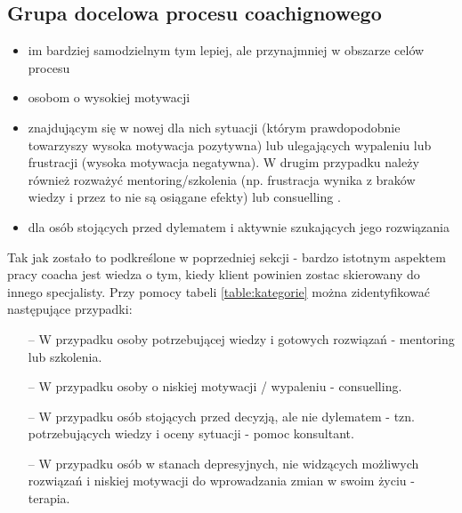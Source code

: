 \subsection{Grupa docelowa procesu coachignowego}

\begin{itemize}
  \item im bardziej samodzielnym tym lepiej, ale przynajmniej w obszarze celów procesu
  \item osobom o wysokiej motywacji
  \item znajdującym się w nowej dla nich sytuacji (którym prawdopodobnie towarzyszy wysoka motywacja pozytywna) lub
       ulegających wypaleniu lub frustracji (wysoka motywacja negatywna). W drugim przypadku należy również rozważyć
       mentoring/szkolenia (np. frustracja wynika z braków wiedzy i przez to nie są osiągane efekty) lub consuelling .
  \item dla osób stojących przed dylematem i aktywnie szukających jego rozwiązania
\end{itemize}

Tak jak zostało to podkreślone w poprzedniej sekcji - bardzo istotnym aspektem pracy coacha jest wiedza o tym, kiedy klient powinien
zostac skierowany do innego specjalisty. Przy pomocy tabeli \ref{table:kategorie} można zidentyfikować następujące przypadki:
\begin{itemize}
\item[--] W przypadku osoby potrzebującej wiedzy i gotowych rozwiązań - mentoring lub szkolenia.
\item[--] W przypadku osoby o niskiej motywacji / wypaleniu - consuelling.
\item[--] W przypadku osób stojących przed decyzją, ale nie dylematem - tzn. potrzebujących wiedzy i oceny sytuacji - pomoc konsultant.
\item[--] W przypadku osób w stanach depresyjnych, nie widzących możliwych rozwiązań i niskiej motywacji do wprowadzania zmian w swoim życiu - terapia.
\end{itemize}
